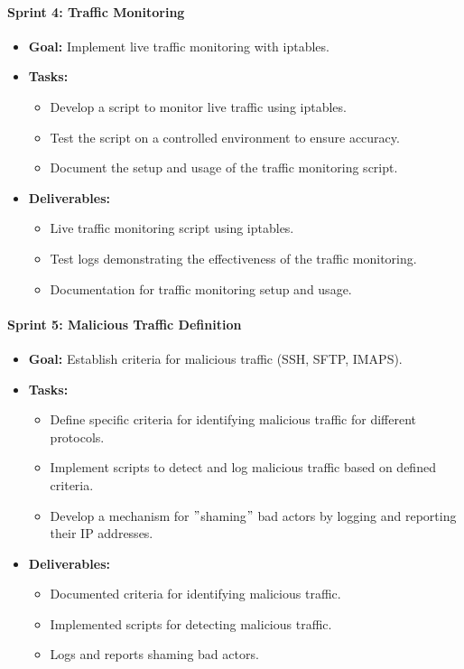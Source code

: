 \documentclass{article}
\begin{document}
    \paragraph{Sprint 4: Traffic Monitoring}
    \begin{itemize}
        \item \textbf{Goal:} Implement live traffic monitoring with iptables.
        \item \textbf{Tasks:}
        \begin{itemize}
            \item Develop a script to monitor live traffic using iptables.
            \item Test the script on a controlled environment to ensure accuracy.
            \item Document the setup and usage of the traffic monitoring script.
        \end{itemize}
        \item \textbf{Deliverables:}
        \begin{itemize}
            \item Live traffic monitoring script using iptables.
            \item Test logs demonstrating the effectiveness of the traffic monitoring.
            \item Documentation for traffic monitoring setup and usage.
        \end{itemize}
    \end{itemize}

    \paragraph{Sprint 5: Malicious Traffic Definition}
    \begin{itemize}
        \item \textbf{Goal:} Establish criteria for malicious traffic (SSH, SFTP, IMAPS).
        \item \textbf{Tasks:}
        \begin{itemize}
            \item Define specific criteria for identifying malicious traffic for different protocols.
            \item Implement scripts to detect and log malicious traffic based on defined criteria.
            \item Develop a mechanism for \("\)shaming\("\) bad actors by logging and reporting their IP addresses.
        \end{itemize}
        \item \textbf{Deliverables:}
        \begin{itemize}
            \item Documented criteria for identifying malicious traffic.
            \item Implemented scripts for detecting malicious traffic.
            \item Logs and reports shaming bad actors.
        \end{itemize}
    \end{itemize}
\end{document}
